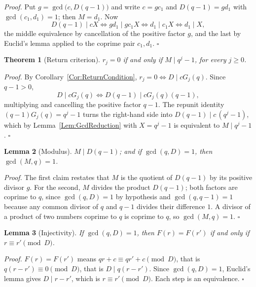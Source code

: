 \documentclass[11pt,letterpaper]{article}
\newtheorem{theorem}{Theorem}
\newtheorem{lemma}[theorem]{Lemma}
\newenvironment{proof}{\noindent\textit{Proof.}}{\hfill\(\square\)}
\begin{document}
\begin{proof}
Put \(g=\gcd\bigl(c,D(q-1)\bigr)\) and write \(c=gc_1\) and \(D(q-1)=gd_1\)
with \(\gcd(c_1,d_1)=1\); then \(M=d_1\). Now
\[
D(q-1)\mid cX\iff gd_1\mid gc_1X\iff d_1\mid c_1X\iff d_1\mid X,
\]
the middle equivalence by cancellation of the positive factor \(g\), and the
last by Euclid's lemma applied to the coprime pair \(c_1,d_1\).
\end{proof}

\begin{theorem}[Return criterion]\label{Thm:Criterion}
\(r_j=0\) if and only if \(M\mid q^{j}-1\), for every \(j\ge0\).
\end{theorem}

\begin{proof}
By Corollary~\ref{Cor:ReturnCondition}, \(r_j=0\iff D\mid cG_j(q)\). Since
\(q-1>0\),
\[
D\mid cG_j(q)\iff D(q-1)\mid cG_j(q)(q-1),
\]
multiplying and cancelling the positive factor \(q-1\). The repunit identity
\((q-1)G_j(q)=q^{j}-1\) turns the right-hand side into
\(D(q-1)\mid c\,(q^{j}-1)\), which by Lemma~\ref{Lem:GcdReduction} with
\(X=q^{j}-1\) is equivalent to \(M\mid q^{j}-1\).
\end{proof}

\begin{lemma}[Modulus]\label{Lem:ModulusDivisor}
\(M\mid D(q-1)\); and if \(\gcd(q,D)=1\), then \(\gcd(M,q)=1\).
\end{lemma}

\begin{proof}
The first claim restates that \(M\) is the quotient of \(D(q-1)\) by its
positive divisor \(g\). For the second, \(M\) divides the product
\(D(q-1)\); both factors are coprime to \(q\), since \(\gcd(q,D)=1\) by
hypothesis and \(\gcd(q,q-1)=1\) because any common divisor of \(q\) and
\(q-1\) divides their difference \(1\). A divisor of a product of two numbers
coprime to \(q\) is coprime to \(q\), so \(\gcd(M,q)=1\).
\end{proof}

\begin{lemma}[Injectivity]\label{Lem:Injectivity}
If \(\gcd(q,D)=1\), then \(F(r)=F(r')\) if and only if
\(r\equiv r'\pmod D\).
\end{lemma}

\begin{proof}
\(F(r)=F(r')\) means \(qr+c\equiv qr'+c\pmod D\), that is
\(q(r-r')\equiv0\pmod D\), that is \(D\mid q(r-r')\). Since \(\gcd(q,D)=1\),
Euclid's lemma gives \(D\mid r-r'\), which is \(r\equiv r'\pmod D\). Each
step is an equivalence.
\end{proof}
\end{document}

